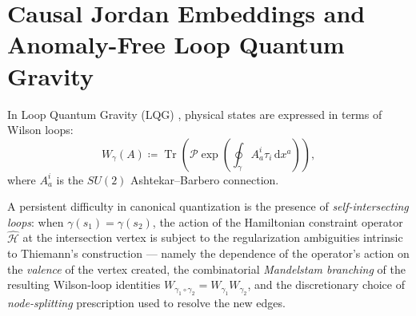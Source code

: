 \documentclass[11pt,a4paper,reqno]{amsart}
\theoremstyle{definition}
\numberwithin{equation}{section}
\newcommand{\Tr}{\operatorname{Tr}}
\newcommand{\dif}{\,\mathrm{d}}
\begin{document}
\section{Causal Jordan Embeddings and Anomaly-Free Loop Quantum Gravity}
\label{sec:jordan_lqg}

In Loop Quantum Gravity (LQG) \cite{ashtekar2004background}, physical states are expressed in terms of Wilson loops:
\begin{equation}
    \label{eq:wilson_loop_operator}
    W_\gamma(A) \coloneqq \Tr\left( \mathcal{P} \exp\left( \oint_\gamma A_a^i \tau_i \dif x^a \right) \right),
\end{equation}
where $A_a^i$ is the $SU(2)$ Ashtekar--Barbero connection.

A persistent difficulty in canonical quantization is the presence of \emph{self-intersecting loops}: when $\gamma(s_1) = \gamma(s_2)$, the action of the Hamiltonian constraint operator $\widehat{\mathcal{H}}$ at the intersection vertex is subject to the regularization ambiguities intrinsic to Thiemann's construction --- namely the dependence of the operator's action on the \emph{valence} of the vertex created, the combinatorial \emph{Mandelstam branching} of the resulting Wilson-loop identities $W_{\gamma_1 \circ \gamma_2} = W_{\gamma_1} W_{\gamma_2}$, and the discretionary choice of \emph{node-splitting} prescription used to resolve the new edges.
\end{document}
